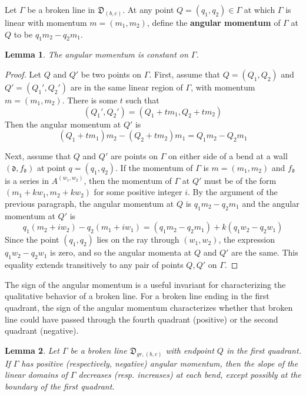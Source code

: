 \documentclass[11pt]{amsart}
\newtheorem{lemma}{Lemma}[section]
\theoremstyle{remark}
\numberwithin{equation}{section}
\newcommand{\fd}{\mathfrak{d}}
\begin{document}
Let $\Gamma$ be a broken line in $\mathfrak{D}_{(b,c)}$.  At any point $Q=(q_1,q_2)\in \Gamma$ at which $\Gamma$ is linear with momentum $m=(m_1,m_2)$, define the \textbf{angular momentum} of $\Gamma$ at $Q$ to be $q_1m_2-q_2m_1$.
\begin{lemma}
The angular momentum is constant on $\Gamma$.
\end{lemma}
\begin{proof}
Let $Q$ and $Q'$ be two points on $\Gamma$.
First, assume that $Q=(Q_1,Q_2)$ and $Q'=(Q_1',Q_2')$ are in the same linear region of $\Gamma$, with momentum $m=(m_1,m_2)$.  There is some $t$ such that 
\[ (Q_1',Q_2') = (Q_1+tm_1,Q_2+tm_2) \]
Then the angular momentum at $Q'$ is 
\[ (Q_1+tm_1)m_2-(Q_2+tm_2)m_1 = Q_1m_2 - Q_2m_1 \]

Next, assume that $Q$ and $Q'$ are points on $\Gamma$ on either side of a bend at a wall $(\fd, f_{\fd})$ at point $q=(q_1,q_2)$.  If the momentum of $\Gamma$ is $m=(m_1,m_2)$ and $f_{\fd}$ is a series in $A^{(w_1,w_2)}$, then the momentum of $\Gamma$ at $Q'$ must be of the form $(m_1+kw_1,m_2+kw_2)$ for some positive integer $i$.  By the argument of the previous paragraph, the angular momentum at $Q$ is $q_1m_2-q_2m_1$
and the angular momentum at $Q'$ is
\[ q_1(m_2+iw_2)-q_2(m_1+iw_1) = (q_1m_2-q_2m_1)+k(q_1w_2-q_2w_1) \]
Since the point $(q_1,q_2)$ lies on the ray through $(w_1,w_2)$, the expression $q_1w_2-q_2w_1$ is zero, and so the angular momenta at $Q$ and $Q'$ are the same.  This equality extends transitively to any pair of points $Q,Q'$ on $\Gamma$.
\end{proof}
The sign of the angular momentum is a useful invariant for characterizing the qualitative behavior of a broken line.
For a broken line ending in the first quadrant, the sign of the angular momentum characterizes whether that broken line could have passed through the fourth quadrant (positive) or the second quadrant (negative).

\begin{lemma}
Let $\Gamma$ be a broken line $\mathfrak{D}_{gr,(b,c)}$ with endpoint $Q$ in the first quadrant. If $\Gamma$ has positive (respectively, negative) angular momentum, then the slope of the linear domains of $\Gamma$ decreases (resp. increases) at each bend, except possibly at the boundary of the first quadrant. 
\end{lemma}
\end{document}
